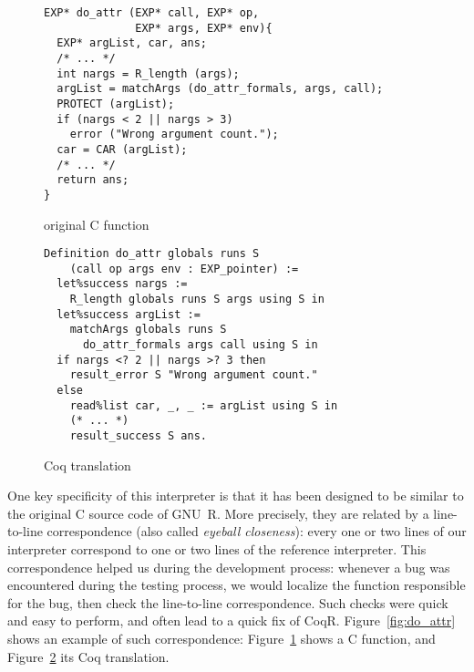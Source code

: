 \documentclass[
    sigplan,
    10pt,
    review, %
    natbib=false %
 ]{acmart}
\begin{document}
\begin{figure*}
    \centering{}
\begin{subfigure}{.54\textwidth}
\begin{verbatim}
EXP* do_attr (EXP* call, EXP* op,
              EXP* args, EXP* env){
  EXP* argList, car, ans;
  /* ... */
  int nargs = R_length (args);
  argList = matchArgs (do_attr_formals, args, call);
  PROTECT (argList);
  if (nargs < 2 || nargs > 3)
    error ("Wrong argument count.");
  car = CAR (argList);
  /* ... */
  return ans;
}
\end{verbatim}
    \caption{original C function}
    \label{fig:c:do_attr}
\end{subfigure}
\begin{subfigure}{.45\textwidth}
\begin{verbatim}
Definition do_attr globals runs S
    (call op args env : EXP_pointer) :=
  let%success nargs :=
    R_length globals runs S args using S in
  let%success argList :=
    matchArgs globals runs S
      do_attr_formals args call using S in
  if nargs <? 2 || nargs >? 3 then
    result_error S "Wrong argument count."
  else
    read%list car, _, _ := argList using S in
    (* ... *)
    result_success S ans.
\end{verbatim}
    \caption{Coq translation}
    \label{fig:coq:do_attr}
\end{subfigure}
    \caption{Original C function and Coq translation of \texttt{do_attr}}
    \label{fig:do_attr}
\end{figure*}

One key specificity of this interpreter is that it has been designed
to be similar to the original C source code of GNU~R.
More precisely, they are related by a line-to-line correspondence
(also called \emph{eyeball closeness}):
every one or two lines of our interpreter
correspond to one or two lines of the reference interpreter.
%
This correspondence helped us during the development process:
whenever a bug was encountered during the testing process,
we would localize the function responsible for the bug,
then check the line-to-line correspondence.
Such checks were quick and easy to perform,
and often lead to a quick fix of CoqR.
%
Figure~\ref{fig:do_attr} shows an example of such correspondence:
Figure~\ref{fig:c:do_attr} shows a C function,
and Figure~\ref{fig:coq:do_attr} its Coq translation.
\end{document}
